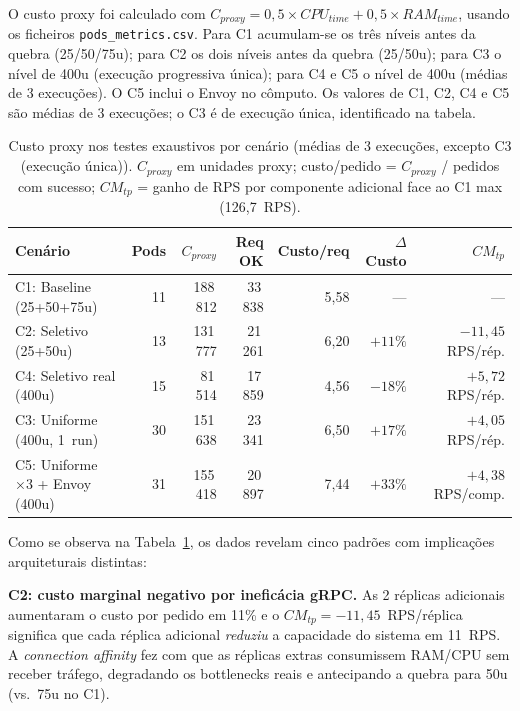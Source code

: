 \documentclass[manuscript,oneside]{acmart}
\begin{document}
O custo proxy foi calculado com $C_{proxy} = 0{,}5 \times CPU_{time} + 0{,}5 \times RAM_{time}$, usando os ficheiros \texttt{pods\_metrics.csv}. Para C1 acumulam-se os três níveis antes da quebra (25/50/75u); para C2 os dois níveis antes da quebra (25/50u); para C3 o nível de 400u (execução progressiva única); para C4 e C5 o nível de 400u (médias de 3 execuções). O C5 inclui o Envoy no cômputo. Os valores de C1, C2, C4 e C5 são médias de 3 execuções; o C3 é de execução única, identificado na tabela.

\begin{table}[H]
\caption{Custo proxy nos testes exaustivos por cenário (médias de 3 execuções, excepto C3 (execução única)). $C_{proxy}$ em unidades proxy; custo/pedido = $C_{proxy}$ / pedidos com sucesso; $CM_{tp}$ = ganho de RPS por componente adicional face ao C1 max (126,7~RPS).}
\label{tab:custo-exaustivo}
\begin{tabular}{lrrrrrr}
\toprule
\textbf{Cenário} & \textbf{Pods} & \textbf{$C_{proxy}$} & \textbf{Req OK} & \textbf{Custo/req} & \textbf{$\Delta$Custo} & \textbf{$CM_{tp}$} \\
\midrule
C1: Baseline (25+50+75u)        & 11 & 188\,812 & 33\,838 & 5{,}58 & —        & — \\
C2: Seletivo (25+50u)           & 13 & 131\,777 & 21\,261 & 6{,}20 & $+11\%$  & $-11{,}45$~RPS/rép. \\
C4: Seletivo real (400u)        & 15 &  81\,514 & 17\,859 & 4{,}56 & $-18\%$  & $+5{,}72$~RPS/rép. \\
C3: Uniforme (400u, 1~run)      & 30 & 151\,638 & 23\,341 & 6{,}50 & $+17\%$  & $+4{,}05$~RPS/rép. \\
C5: Uniforme ×3 + Envoy (400u) & 31 & 155\,418 & 20\,897 & 7{,}44 & $+33\%$  & $+4{,}38$~RPS/comp. \\
\bottomrule
\end{tabular}
\end{table}

Como se observa na Tabela~\ref{tab:custo-exaustivo}, os dados revelam cinco padrões com implicações arquiteturais distintas:

\textbf{C2: custo marginal negativo por ineficácia gRPC.} As 2 réplicas adicionais aumentaram o custo por pedido em 11\% e o $CM_{tp}=-11{,}45$~RPS/réplica significa que cada réplica adicional \emph{reduziu} a capacidade do sistema em 11~RPS. A \textit{connection affinity} fez com que as réplicas extras consumissem RAM/CPU sem receber tráfego, degradando os bottlenecks reais e antecipando a quebra para 50u (vs.\ 75u no C1).
\end{document}
